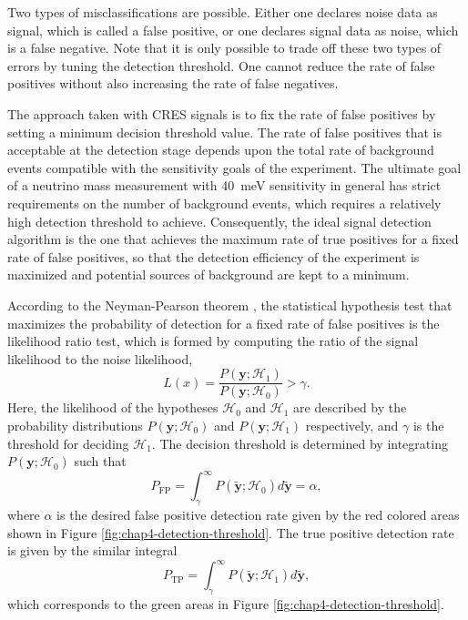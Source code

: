 Two types of misclassifications are possible. Either one declares noise data as signal, which is called a false positive, or one declares signal data as noise, which is a false negative. Note that it is only possible to trade off these two types of errors by tuning the detection threshold. One cannot reduce the rate of false positives without also increasing the rate of false negatives.

The approach taken with CRES signals is to fix the rate of false positives by setting a minimum decision threshold value. The rate of false positives that is acceptable at the detection stage depends upon the total rate of background events compatible with the sensitivity goals of the experiment. The ultimate goal of a neutrino mass measurement with 40~meV sensitivity in general has strict requirements on the number of background events, which requires a relatively high detection threshold to achieve. Consequently, the ideal signal detection algorithm is the one that achieves the maximum rate of true positives for a fixed rate of false positives, so that the detection efficiency of the experiment is maximized and potential sources of background are kept to a minimum.

According to the Neyman-Pearson theorem \cite{neyman_pearson_lemma}, the statistical hypothesis test that maximizes the probability of detection for a fixed rate of false positives is the likelihood ratio test, which is formed by computing the ratio of the signal likelihood to the noise likelihood,
\begin{equation}
    L(x)=\frac{P(\bm{y};\mathcal{H}_1)}{P(\bm{y};\mathcal{H}_0)}>\gamma.
\end{equation}
Here, the likelihood of the hypotheses $\mathcal{H}_0$ and $\mathcal{H}_1$ are described by the probability distributions $P(\bm{y};\mathcal{H}_0)$ and $P(\bm{y};\mathcal{H}_1)$ respectively, and $\gamma$ is the threshold for deciding $\mathcal{H}_1$. The decision threshold is determined by integrating $P(\bm{y};\mathcal{H}_0)$ such that 
\begin{equation}
    P_{\textrm{FP}}=\int_\gamma^\infty{P(\tilde{\bm{y}};\mathcal{H}_0)d\tilde{\bm{y}}}=\alpha,
\end{equation}
where $\alpha$ is the desired false positive detection rate given by the red colored areas shown in Figure \ref{fig:chap4-detection-threshold}. The true positive detection rate is given by the similar integral 
\begin{equation}
    P_{\textrm{TP}}=\int_\gamma^\infty{P(\tilde{\bm{y}};\mathcal{H}_1)d\tilde{\bm{y}}},
\end{equation}
which corresponds to the green areas in Figure \ref{fig:chap4-detection-threshold}.

